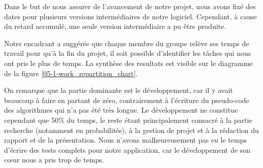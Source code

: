 Dans le but de nous assurer de l'avancement de notre projet, nous avons fixé des dates pour plusieurs versions intermédiaires de notre logiciel. Cependant, à cause du retard accumulé, une seule version intermédiaire a pu être produite.

Notre encadrant a suggérée que chaque membre du groupe relève ses temps de travail pour qu'à la fin du projet, il soit possible d'identifier les tâches qui nous ont pris le plus de temps. La synthèse des resultats est visible sur le diagramme de la figure \ref{05-1-work_repartition_chart}.

On remarque que la partie dominante est le développement, car il y avait beaucoup à faire en partant de zéro, contrairement à l'écriture du pseudo-code des algorithmes qui n'a pas été très longue. Le développement ne constitue cependant que 50\% du temps, le reste étant principalement consacré à la partie recherche (notamment en probabilités), à la gestion de projet et à la rédaction du rapport et de la présentation.
Nous n'avons malheureusement pas eu le temps d'écrire des tests complets pour notre application, car le développement de son cœur nous a pris trop de temps.


